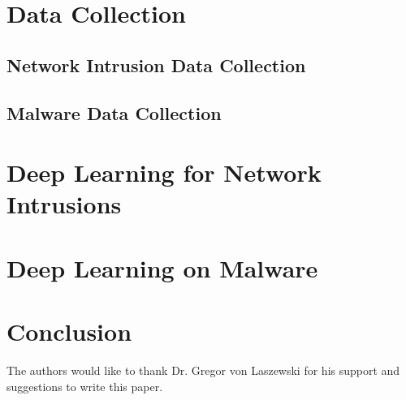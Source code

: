 \documentclass[sigconf]{acmart}
\begin{document}
\section{Data Collection}
\subsection{Network Intrusion Data Collection}
\subsection{Malware Data Collection}


\section{Deep Learning for Network Intrusions}




\section{Deep Learning on Malware}



\section{Conclusion}




\begin{acks}

  The authors would like to thank Dr. Gregor von Laszewski for his
  support and suggestions to write this paper.

\end{acks}


 
\end{document}
